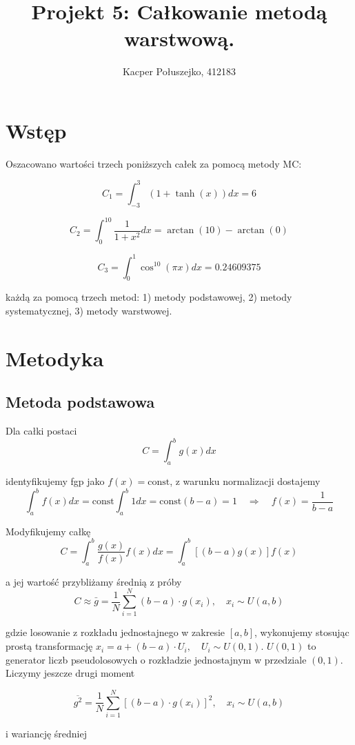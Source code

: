 \documentclass[a4paper,12pt,twoside]{article}
\title{\textbf{Projekt 5: Całkowanie metodą warstwową.}}
\author{Kacper Połuszejko, 412183}
\date{}
\begin{document}
\maketitle

\section*{Wstęp}

Oszacowano wartości trzech poniższych całek za pomocą metody MC:


\[
C_1 = \int_{-3}^{3} \left(1 + \tanh(x)\right) dx = 6
\]

\[
C_2 = \int_{0}^{10} \frac{1}{1 + x^2} dx = \arctan(10) - \arctan(0)
\]

\[
C_3 = \int_{0}^{1} \cos^{10}(\pi x) dx = 0.24609375
\]


każdą za pomocą trzech metod: 1) metody podstawowej, 2) metody systematycznej, 3) metody warstwowej.

\section{Metodyka}

\subsection{Metoda podstawowa}


Dla całki postaci
\[
C = \int_a^b g(x) dx
\]

identyfikujemy fgp jako \( f(x) = \text{const} \), z warunku normalizacji dostajemy
\[
\int_a^b f(x) dx = \text{const} \int_a^b 1 dx = \text{const}(b - a) = 1 \quad \Rightarrow \quad f(x) = \frac{1}{b - a}
\]

Modyfikujemy całkę
\[
C = \int_a^b \frac{g(x)}{f(x)} f(x) dx = \int_a^b [(b - a) g(x)] f(x)
\]

a jej wartość przybliżamy średnią z próby
\[
C \approx \bar{g} = \frac{1}{N} \sum_{i=1}^N (b - a) \cdot g(x_i), \quad x_i \sim U(a, b)
\]

gdzie losowanie z rozkładu jednostajnego w zakresie \([a, b]\), wykonujemy stosując prostą transformację \( x_i = a + (b - a) \cdot U_i, \quad U_i \sim U(0, 1) \). \( U(0, 1) \) to generator liczb pseudolosowych o rozkładzie jednostajnym w przedziale \((0, 1)\). Liczymy jeszcze drugi moment

\[
\overline{g^2} = \frac{1}{N} \sum_{i=1}^N [(b - a) \cdot g(x_i)]^2 , \quad x_i \sim U(a, b)
\]

i wariancję średniej
\end{document}
